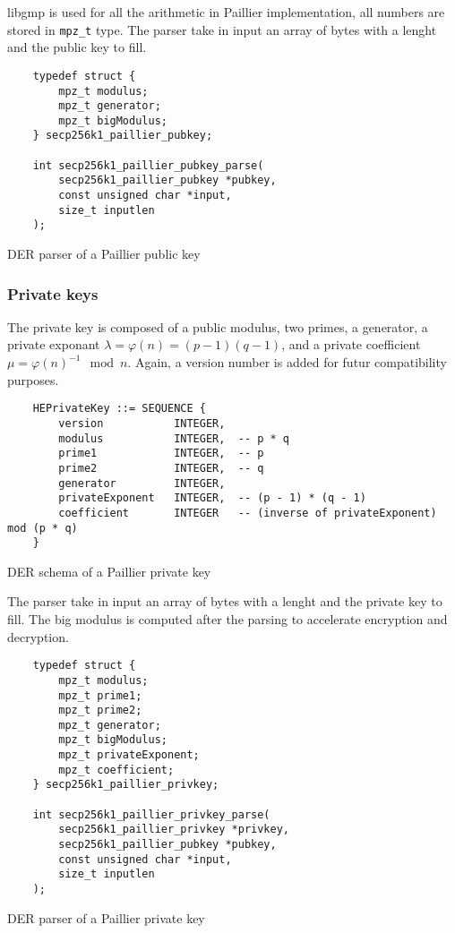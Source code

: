 libgmp is used for all the arithmetic in Paillier implementation, all numbers are
stored in \texttt{mpz\_t} type. The parser take in input an array of bytes with a
lenght and the public key to fill.

\begin{listing}
  \begin{verbatim}
    typedef struct {
        mpz_t modulus;
        mpz_t generator;
        mpz_t bigModulus;
    } secp256k1_paillier_pubkey;

    int secp256k1_paillier_pubkey_parse(
        secp256k1_paillier_pubkey *pubkey,
        const unsigned char *input,
        size_t inputlen
    );
  \end{verbatim}
	\caption{DER parser of a Paillier public key}
	\label{lst:DERImplPaillierParsePub}
\end{listing}


\subsubsection{Private keys}

The private key is composed of a public modulus, two primes, a generator, a
private exponant $\lambda = \varphi(n) = (p-1)(q-1)$, and a private coefficient
$\mu = \varphi(n)^{-1} \mod n$. Again, a version number is added for futur
compatibility purposes.

\begin{listing}
  \begin{verbatim}
    HEPrivateKey ::= SEQUENCE {
        version           INTEGER,
        modulus           INTEGER,  -- p * q
        prime1            INTEGER,  -- p
        prime2            INTEGER,  -- q
        generator         INTEGER,
        privateExponent   INTEGER,  -- (p - 1) * (q - 1)
        coefficient       INTEGER   -- (inverse of privateExponent) mod (p * q)
    }
  \end{verbatim}
	\caption{DER schema of a Paillier private key}
	\label{lst:DERSchemaPaillierPriv}
\end{listing}

The parser take in input an array of bytes with a lenght and the private key to fill.
The big modulus is computed after the parsing to accelerate encryption and decryption.

\begin{listing}
  \begin{verbatim}
    typedef struct {
        mpz_t modulus;
        mpz_t prime1;
        mpz_t prime2;
        mpz_t generator;
        mpz_t bigModulus;
        mpz_t privateExponent;
        mpz_t coefficient;
    } secp256k1_paillier_privkey;

    int secp256k1_paillier_privkey_parse(
        secp256k1_paillier_privkey *privkey,
        secp256k1_paillier_pubkey *pubkey,
        const unsigned char *input,
        size_t inputlen
    );
  \end{verbatim}
	\caption{DER parser of a Paillier private key}
	\label{lst:DERImplPaillierParsePriv}
\end{listing}

